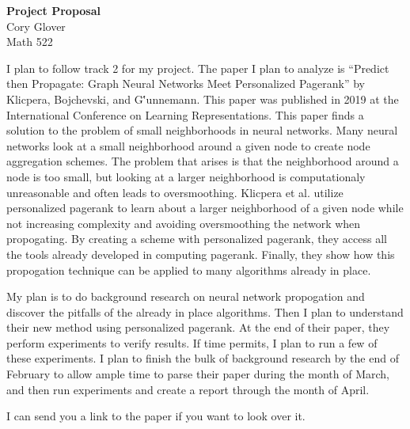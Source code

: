 \documentclass[11pt]{article}
\begin{document}
\begin{center}
\textbf{Project Proposal}\\
Cory Glover\\
Math 522
\end{center}

I plan to follow track 2 for my project. The paper I plan to analyze is ``Predict then Propagate: Graph Neural Networks Meet Personalized Pagerank'' by Klicpera, Bojchevski, and G\''{u}nnemann. This paper was published in 2019 at the International Conference on Learning Representations. This paper finds a solution to the problem of small neighborhoods in neural networks. Many neural networks look at a small neighborhood around a given node to create node aggregation schemes. The problem that arises is that the neighborhood around a node is too small, but looking at a larger neighborhood is computationaly unreasonable and often leads to oversmoothing. Klicpera et al. utilize personalized pagerank to learn about a larger neighborhood of a given node while not increasing complexity and avoiding oversmoothing the network when propogating. By creating a scheme with personalized pagerank, they access all the tools already developed in computing pagerank. Finally, they show how this propogation technique can be applied to many algorithms already in place.

My plan is to do background research on neural network propogation and discover the pitfalls of the already in place algorithms. Then I plan to understand their new method using personalized pagerank. At the end of their paper, they perform experiments to verify results. If time permits, I plan to run a few of these experiments. I plan to finish the bulk of background research by the end of February to allow ample time to parse their paper during the month of March, and then run experiments and create a report through the month of April.

I can send you a link to the paper if you want to look over it.
\end{document}
